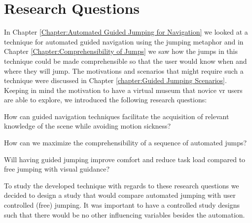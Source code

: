 \label{Chapter:Design of the User Study}
\section{Research Questions}
\label{section:DUS Research Questions}
In Chapter \ref{Chapter:Automated Guided Jumping for Navigation} we looked at a technique for automated guided navigation using the jumping metaphor and in Chapter \ref{Chapter:Comprehensibility of Jumps} we saw how the jumps in this technique could be made comprehensible so that the user would know when and where they will jump. The motivations and scenarios that might require such a technique were discussed in Chapter \ref{chapter:Guided Jumping Scenarios}. Keeping in mind the motivation to have a virtual museum that novice \acrshort{vr} users are able to explore, we introduced the following research questions:

\begin{researchq}
	\label{rq:rq1}
	How can guided navigation techniques facilitate the acquisition of relevant knowledge of the scene while avoiding motion sickness?
\end{researchq}
\begin{researchq}
	\label{rq:rq2}
	How can we maximize the comprehensibility of a sequence of automated jumps?
\end{researchq}
\begin{researchq}
	\label{rq:rq3}
	Will having guided jumping improve comfort and reduce task load compared to free jumping with visual guidance?
\end{researchq}
To study the developed technique with regards to these research questions we decided to design a study that would compare automated jumping with user controlled (free) jumping. It was important to have a controlled study designs such that there would be no other influencing variables besides the automation.